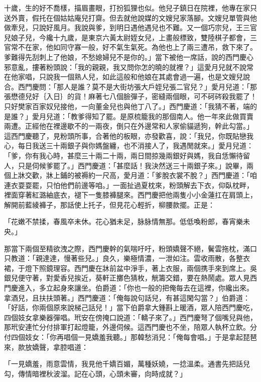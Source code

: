 \begin{showcontents}{}
十歲，生的好不喬樣，描眉畫眼，打扮狐狸也似。他兒子鎮日在院裡，他專在家只送外賣，假托在個姑姑庵兒打齋。但去就他說媒的文嫂兒家落腳。文嫂兒單管與他做牽兒，只說好風月。我說與爹，到明日遇他遇兒也不難。又一個巧宗兒，王三官兒娘子兒，今纔十九歲，是東京六黃太尉姪女兒，上畫般標致，雙陸棋子都會，三官常不在家，他如同守寡一般，好不氣生氣死。為他也上了兩三遭吊，救下來了。爹難得先刮刺上了他娘，不愁媳婦兒不是你的。」當下被他一席話，說的西門慶心邪意亂，摟著粉頭說：「我的親親，我又問你怎的曉的就裡？」這愛月兒就不說常在他家唱，只說我一個熟人兒，如此這般和他娘在其處會過一遍，也是文嫂兒說合。西門慶問：「那人是誰？莫不是大街坊張大戶姪兒張二官兒？」愛月兒道：「那張懋德兒好｛入日｝的貨！麻著七八個臉彈子，密縫兩個眼，可不砢硶殺我罷了！只好樊家百家奴兒接他，一向董金兒也與他丁八了。」西門慶道：「我猜不著，端的是誰？」愛月兒道：「教爹得知了罷。是原梳籠我的那個南人。他一年來此做買賣兩遭。正經他在裡邊歇不的一兩夜，倒只在外邊常和人家偷貓遞狗，幹此勾當。」這西門慶聽了，見粉頭所事，合著他的板眼，亦發歡喜，說：「我兒，你既貼戀我心，每日我送三十兩銀子與你媽盤纏，也不消接人了，我遇閒就來。」愛月兒道：「爹，你有我心時，甚麼三十兩二十兩，兩日間掠幾兩銀好與媽，我自恁懶待留人，只是伺候爹罷了。」西門慶道：「甚麼話！我決然送三十兩銀子來。」說畢，兩個上牀交歡，牀上鋪的被褥約一尺高，愛月道：「爹脫衣裳不脫？」西門慶道：「咱連衣耍耍罷，只怕他們前邊等咱。」一面扯過夏枕來，粉頭解去下衣，仰臥枕畔，裡面穿著紅潞紬底衣，褪下一隻膝褲腿來。西門慶把他兩隻小小金蓮扛在肩頭上，解開前藍綾褲子，那話使上托子，但見花心輕折，柳腰款擺。正是：

「花嫩不禁揉，春風卒未休。花心猶未足，脉脉情無那。低低喚粉郎，春宵樂未央。」

那當下兩個至精欲洩之際，西門慶幹的氣喘吁吁，粉頭嬌聲不絕，鬢雲拖枕，滿口只教道：「親達達，慢著些兒。」良久，樂極情濃，一泄如注。雲收雨散，各整衣裙，于燈下照鏡理容。西門慶在牀前盆中淨手，著上衣服，兩個携手來到席上。吳銀兒便守著，對愛香兒挨近，葵軒正擲色猜枚，觥籌交錯，要在熱鬧處。眾人見西門慶進入，多立起身來讓坐。伯爵道：「你也一般的把俺每去在這裡，你纔出來。拿酒兒，且扶扶頭著。」西門慶道：「俺每說句話兒，有甚這閑勾當？」伯爵道：「好話，你兩個原來說梯己話兒！」當下伯爵拿大鍾斟上暖酒，眾人陪西門慶吃，四個妓女拿樂器彈唱。玳安在傍掩口說道：「轎子來了。」西門慶弩了個嘴兒與他，那玳安連忙分付排軍打起燈籠，外邊伺候。這西門慶也不坐，陪眾人執杯立飲。分付四個妓女：「你再唱個一見嬌羞我聽。」那韓愁消兒：「俺每會唱。」于是拿起琵琶來，款放嬌聲，拿腔唱道：

「一見嬌羞，雨意雲情，我見他千嬌百媚，萬種妖嬈，一捻溫柔。通書先把話兒勾，傳情暗裡秋波溜。記在心頭，心頭未審，向時成就？」


\end{showcontents}
